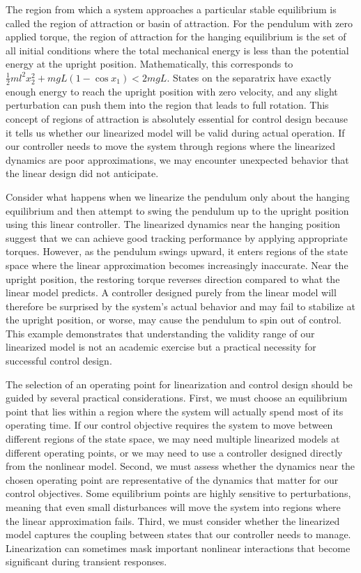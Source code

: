 The region from which a system approaches a particular stable equilibrium is called the region of attraction or basin of attraction. For the pendulum with zero applied torque, the region of attraction for the hanging equilibrium is the set of all initial conditions where the total mechanical energy is less than the potential energy at the upright position. Mathematically, this corresponds to $\frac{1}{2}ml^2x_2^2 + mgL(1 - \cos x_1) < 2mgL$. States on the separatrix have exactly enough energy to reach the upright position with zero velocity, and any slight perturbation can push them into the region that leads to full rotation. This concept of regions of attraction is absolutely essential for control design because it tells us whether our linearized model will be valid during actual operation. If our controller needs to move the system through regions where the linearized dynamics are poor approximations, we may encounter unexpected behavior that the linear design did not anticipate.

Consider what happens when we linearize the pendulum only about the hanging equilibrium and then attempt to swing the pendulum up to the upright position using this linear controller. The linearized dynamics near the hanging position suggest that we can achieve good tracking performance by applying appropriate torques. However, as the pendulum swings upward, it enters regions of the state space where the linear approximation becomes increasingly inaccurate. Near the upright position, the restoring torque reverses direction compared to what the linear model predicts. A controller designed purely from the linear model will therefore be surprised by the system's actual behavior and may fail to stabilize at the upright position, or worse, may cause the pendulum to spin out of control. This example demonstrates that understanding the validity range of our linearized model is not an academic exercise but a practical necessity for successful control design.

The selection of an operating point for linearization and control design should be guided by several practical considerations. First, we must choose an equilibrium point that lies within a region where the system will actually spend most of its operating time. If our control objective requires the system to move between different regions of the state space, we may need multiple linearized models at different operating points, or we may need to use a controller designed directly from the nonlinear model. Second, we must assess whether the dynamics near the chosen operating point are representative of the dynamics that matter for our control objectives. Some equilibrium points are highly sensitive to perturbations, meaning that even small disturbances will move the system into regions where the linear approximation fails. Third, we must consider whether the linearized model captures the coupling between states that our controller needs to manage. Linearization can sometimes mask important nonlinear interactions that become significant during transient responses.

